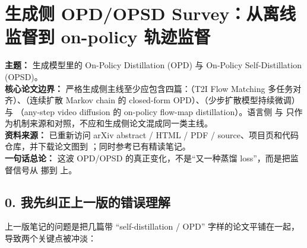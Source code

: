 
\section{生成侧 OPD/OPSD Survey：从离线监督到 on-policy 轨迹监督}

\begin{conceptbox}
\textbf{主题：} 生成模型里的 On-Policy Distillation (OPD) 与 On-Policy Self-Distillation (OPSD)。\\
\textbf{核心论文边界：} 严格生成侧主线至少应包含四篇：（T2I Flow Matching 多任务对齐）、（连续扩散 Markov chain 的 closed-form OPD）、（少步扩散模型持续微调）与 （any-step video diffusion 的 on-policy flow-map distillation）。语言侧  与  只作为机制来源和对照，不应和生成侧论文混成同一类主线。\\
\textbf{资料来源：} 已重新访问 arXiv abstract / HTML / PDF / source、项目页和代码仓库，并下载论文图到 ；同时参考已有精读笔记。\\
\textbf{一句话总论：} 这波 OPD/OPSD 的真正变化，不是“又一种蒸馏 loss”，而是把监督信号从  挪到  上。
\end{conceptbox}

\subsection{0. 我先纠正上一版的错误理解}

上一版笔记的问题是把几篇带 “self-distillation / OPD” 字样的论文平铺在一起，导致两个关键点被冲淡：


